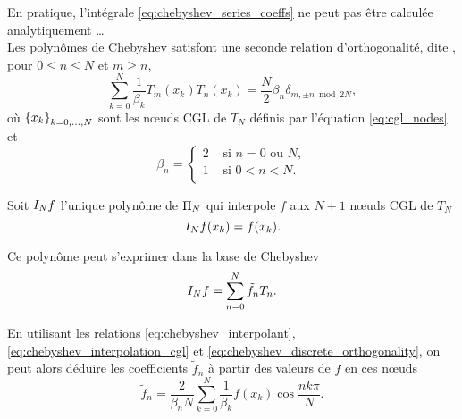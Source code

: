 En pratique, l'intégrale \eqref{eq:chebyshev_series_coeffs} ne peut pas être calculée analytiquement  \ldots\\
Les polynômes de Chebyshev satisfont une seconde relation d'orthogonalité, dite , pour $0 \leq n \leq N$ et $m \geq n$,
\begin{equation}
	\sum_{k=0}^{N} \frac{1}{\beta_k} T_m(x_k) T_n(x_k) = 
	\frac{N}{2} \beta_n \delta_{m,\pm n \bmod{2N}},
	\label{eq:chebyshev_discrete_orthogonality}
\end{equation}
où $\family{x}{k}{0}{N}$ sont les n\oe uds CGL de $T_N$ définis par l'équation \eqref{eq:cgl_nodes} et
\begin{equation}
	\beta_n = 
	\begin{cases}
	 2 & \text{\ si\ } n = 0 \text{\ ou\ } N,   \\ 
	 1 & \text{\ si\ } 0 < n < N.\\ 
	\end{cases}
\end{equation}

\par


Soit $\interpolant{f}{N}$ l'unique polynôme de $\polyspace{N}$ qui interpole $f$ aux $N+1$ n\oe uds CGL de $T_N$
\begin{equation}
	\interpolant{f}{N}(x_k) = f(x_k).
	\label{eq:chebyshev_interpolation_cgl}
\end{equation}

Ce polynôme peut s'exprimer dans la base de Chebyshev
\begin{equation}
	\interpolant{f}{N} = \sum_{n=0}^{N} \tilde{f}_n T_n.
	\label{eq:chebyshev_interpolant}
\end{equation}

En utilisant les relations \eqref{eq:chebyshev_interpolant}, \eqref{eq:chebyshev_interpolation_cgl} et \eqref{eq:chebyshev_discrete_orthogonality}, on peut alors déduire les coefficients $\tilde{f}_n$ à partir des valeurs de $f$ en ces n\oe uds%
\begin{equation}
	\tilde{f}_n = \frac{2}{\beta_n N} \sum_{k=0}^{N} \frac{1}{\beta_k} f(x_k) \cos \frac{n k \pi}{N}.
	\label{eq:chebyshev_dct}
\end{equation}

